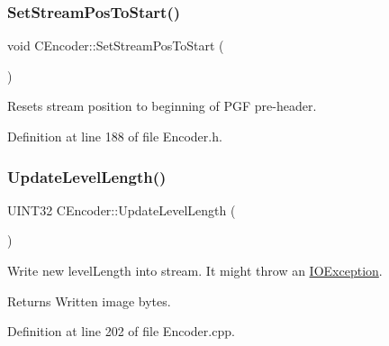 \subsubsection{\texorpdfstring{SetStreamPosToStart()}{SetStreamPosToStart()}}
{\footnotesize\ttfamily void C\+Encoder\+::\+Set\+Stream\+Pos\+To\+Start (\begin{DoxyParamCaption}{ }\end{DoxyParamCaption})\hspace{0.3cm}{\ttfamily [inline]}}



Resets stream position to beginning of P\+GF pre-\/header. 



Definition at line 188 of file Encoder.\+h.


\begin{DoxyCode}{0}

\end{DoxyCode}
\mbox{\label{classCEncoder_a93d5e9bf075e804eb9626d4b0292c4dd}} 
\subsubsection{\texorpdfstring{UpdateLevelLength()}{UpdateLevelLength()}}
{\footnotesize\ttfamily U\+I\+N\+T32 C\+Encoder\+::\+Update\+Level\+Length (\begin{DoxyParamCaption}{ }\end{DoxyParamCaption})}

Write new level\+Length into stream. It might throw an \mbox{\hyperlink{structIOException}{I\+O\+Exception}}. \begin{DoxyReturn}{Returns}
Written image bytes. 
\end{DoxyReturn}


Definition at line 202 of file Encoder.\+cpp.


